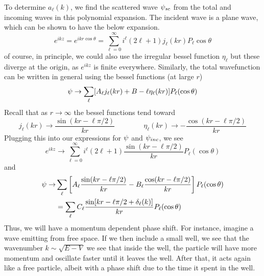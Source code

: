 To determine \(a_\ell(k)\), we find the scattered wave \(\psi_{sc}\) from the total and incoming waves in this polynomial expansion. The incident wave is a plane wave, which can be shown to have the below expansion.
\[e^{ikz} = e^{ikr\cos\theta} = \sum_{\ell=0}^\infty i^\ell(2\ell+1)j_\ell(kr)P_\ell\cos\theta\]
of course, in principle, we could also use the irregular bessel function \(\eta_\ell\) but these diverge at the origin, as \(e^{ikz}\) is finite everywhere. Similarly, the total wavefunction can be written in general using the bessel functions (at large \(r\))
\[\psi\rightarrow \sum_{\ell} [A_\ell j_\ell(kr) + B-\ell \eta_\ell(kr)]P_\ell (\cos\theta)\]
Recall that as \(r\to\infty\) the bessel functions tend toward
\[j_\ell(kr)\to\frac{\sin(kr-\ell\pi/2)}{kr}\qquad \qquad \eta_\ell(kr)\to -\frac{\cos(kr-\ell\pi/2)}{kr}\]
Plugging this into our expressions for \(\psi\) and \(\psi_{inc}\), we see
\[e^{ikz}\to \sum_{\ell=0}^\infty i^\ell(2\ell+1)\frac{\sin(kr-\ell\pi/2)}{kr}P_\ell(\cos\theta)\]
and
\begin{align*}
	\psi\rightarrow&\sum_{\ell}\left[A_\ell\frac{\sin(kr-\ell\pi/2)}{kr}-B_\ell\frac{\cos(kr-\ell\pi/2)}{kr}\right]P_\ell(\cos\theta)\\
	     &= \sum_\ell C_\ell \frac{\sin[kr-\ell\pi/2 +\delta_\ell(k)]}{kr}P_\ell(\cos\theta)
\end{align*}
Thus, we will have a momentum dependent phase shift. For instance, imagine a wave emitting from free space. If we then include a small well, we see that the wavenumber \(k\sim\sqrt{E-V}\) we see that inside the well, the particle will have more momentum and oscillate faster until it leaves the well. After that, it acts again like a free particle, albeit with a phase shift due to the time it spent in the well.

